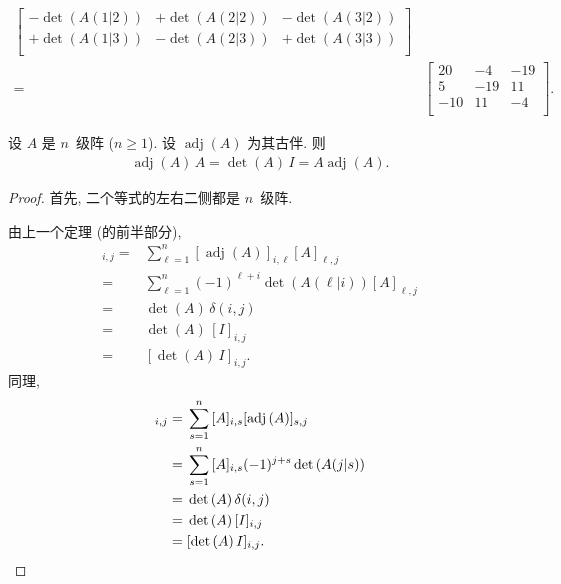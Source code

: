 \documentclass[%
    UTF8,%
    fontset=none,%
    punct=kaiming,%
    zihao=-4,%
    a4paper,%
    oneside,%
]{ctexbook}
\renewcommand*{\geq}{\geqslant}
\begin{document}
\begin{example}
\begin{align*}
\begin{bmatrix}
            -\det {(A(1|2))}
             & +\det {(A(2|2))}
             & -\det {(A(3|2))} \\
            +\det {(A(1|3))}
             & -\det {(A(2|3))}
             & +\det {(A(3|3))} \\
        \end{bmatrix}
        \\
        = {} &
        \begin{bmatrix}
            20  & -4  & -19 \\
            5   & -19 & 11  \\
            -10 & 11  & -4  \\
        \end{bmatrix}.
    \end{align*}
\end{example}

\begin{theorem}
    设 \(A\) 是 \(n\)~级阵 (\(n \geq 1\)).
    设 \(\operatorname{adj} {(A)}\) 为其古伴.
    则
    \begin{align*}
        \operatorname{adj} {(A)}\, A
        = \det {(A)}\, I
        = A \operatorname{adj} {(A)}.
    \end{align*}
\end{theorem}

\begin{proof}
    首先, 二个等式的左右二侧都是 \(n\)~级阵.

    由上一个定理 (的前半部分),
    \begin{align*}
        [\operatorname{adj} {(A)}\, A]_{i,j}
        = {} &
        \sum_{\ell = 1}^{n}
        {[\operatorname{adj} {(A)}]_{i,\ell} [A]_{\ell,j}}
        \\
        = {} &
        \sum_{\ell = 1}^{n}
        {(-1)^{\ell+i} \det {(A(\ell|i))} [A]_{\ell,j}}
        \\
        = {} & \det {(A)}\, \delta(i, j)
        \\
        = {} & \det {(A)}\, [I]_{i,j}
        \\
        = {} & [\det {(A)}\, I]_{i,j}.
    \end{align*}
    同理,
    \begin{align*}
        [A \operatorname{adj} {(A)}]_{i,j}
        = {} &
        \sum_{s = 1}^{n}
        {[A]_{i,s} [\operatorname{adj} {(A)}]_{s,j}}
        \\
        = {} &
        \sum_{s = 1}^{n}
        {[A]_{i,s} (-1)^{j+s} \det {(A(j|s))}}
        \\
        = {} & \det {(A)}\, \delta(i, j)
        \\
        = {} & \det {(A)}\, [I]_{i,j}
        \\
        = {} & [\det {(A)}\, I]_{i,j}.
        \qedhere
    \end{align*}
\end{proof}
\end{document}
